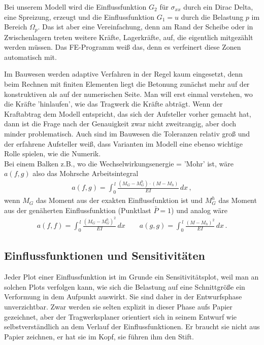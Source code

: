 {{{{{\begin{remark}
Bei unserem Modell wird die Einflussfunktion $G_2$ f\"{u}r $\sigma_{xx}$ durch ein Dirac Delta, eine Spreizung, erzeugt und die Einflussfunktion $G_1 = u$ durch die Belastung $p$ im Bereich $\Omega_p$. Das ist aber eine Vereinfachung, denn am Rand der Scheibe oder in Zwischenlagern treten weitere Kr\"{a}fte, Lagerkr\"{a}fte, auf, die eigentlich mitgez\"{a}hlt werden m\"{u}ssen. Das FE-Programm wei{\ss} das, denn es verfeinert diese Zonen automatisch mit.
\end{remark}
Im Bauwesen werden adaptive Verfahren in der Regel kaum eingesetzt, denn beim Rechnen mit finiten Elementen liegt die Betonung zun\"{a}chst mehr auf der konstruktiven als auf der numerischen Seite. Man will erst einmal verstehen, wo die Kr\"{a}fte 'hinlaufen', wie das Tragwerk die Kr\"{a}fte abtr\"{a}gt. Wenn der Kraftabtrag  dem Modell entspricht, das sich der Aufsteller vorher gemacht hat, dann ist die Frage nach der Genauigkeit zwar nicht zweitrangig, aber doch minder problematisch. Auch sind im Bauwesen die Toleranzen relativ gro{\ss} und der erfahrene Aufsteller wei{\ss}, dass Varianten im Modell eine ebenso wichtige Rolle spielen, wie die Numerik.\\

Bei einem Balken z.B., wo die Wechselwirkungsenergie = 'Mohr' ist, w\"{a}re $a(f,g)$ also das Mohrsche Arbeitsintegral
\begin{align}
a(f,g) = \int_0^{\,l} \frac{(M_G - M_{G}^h) \cdot (M-M_h)}{EI} \,dx\,,
\end{align}
wenn $M_G$ das Moment aus der exakten Einflussfunktion ist und $M_{G}^h$ das Moment aus der gen\"{a}herten Einflussfunktion (Punktlast $\bar{P} = 1$) und analog w\"{a}re
\begin{align}
a(f,f) = \int_0^{\,l} \frac{(M_G - M_{G}^h)^2}{EI} \,dx \qquad a(g,g) = \int_0^{\,l} \frac{(M-M_h)^2}{EI} \,dx\,.
\end{align}

{\textcolor{blau2}{\section{Einflussfunktionen und Sensitivit\"{a}ten}}}
Jeder Plot einer Einflussfunktion ist im Grunde ein Sensitivit\"{a}tsplot, weil man an solchen Plots verfolgen kann, wie sich die Belastung auf eine Schnittgr\"{o}{\ss}e ein Verformung in dem Aufpunkt auswirkt. Sie sind daher in der Entwurfsphase unverzichtbar. Zwar werden sie selten explizit in dieser Phase aufs Papier gezeichnet, aber der Tragwerksplaner orientiert sich in seinem Entwurf wie selbstverst\"{a}ndlich an dem Verlauf der Einflussfunktionen. Er braucht sie nicht aus Papier zeichnen, er hat sie im Kopf, sie f\"{u}hren ihm den Stift.

}}}}}
